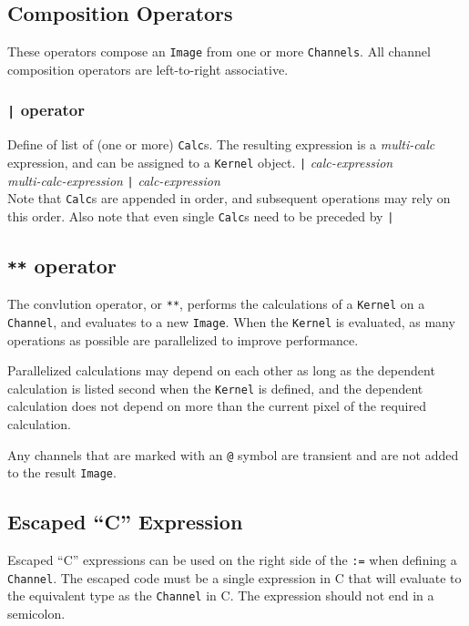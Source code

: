 \subsection{Composition Operators}
\label{ssec:compositionops}
These operators compose an \texttt{Image} from one or more \texttt{Channels}.
All channel composition operators are left-to-right associative.

\subsubsection{\texttt{|} operator}
\label{sssec:barop}
Define of list of (one or more) \texttt{Calc}s. The resulting expression is a
\emph{multi-calc} expression, and can be assigned
to a \texttt{Kernel} object.
\startsyn
\texttt{|} \emph{calc-expression} \\
\emph{multi-calc-expression} \texttt{|} \emph{calc-expression} \\
\stopsyn
Note that \texttt{Calc}s are appended in order, and
subsequent operations may rely on this order.
Also note that even single \texttt{Calc}s need to be preceded by \texttt{|}

\subsection{\texttt{**} operator}
\label{ssec:convolutionop}

The convlution operator, or \texttt{**}, performs the calculations of a
\texttt{Kernel} on a \texttt{Channel}, and evaluates to a new \texttt{Image}.
When the \texttt{Kernel} is evaluated, as many operations as possible are
parallelized to improve performance.

Parallelized calculations may depend on each other as long as the
dependent calculation is listed second when the \texttt{Kernel} is
defined, and the dependent calculation does not depend on more than
the current pixel of the required calculation.

Any channels that are marked with an \texttt{@} symbol are transient and
are not added to the result \texttt{Image}.

\subsection{Escaped ``C'' Expression}
\label{ssec:escapedC}

Escaped ``C'' expressions can be used on the right side of the \texttt{:=}
when defining a \texttt{Channel}. The escaped code must be a single expression
in C that will evaluate to the equivalent type as the \texttt{Channel} in C.
The expression should not end in a semicolon.

